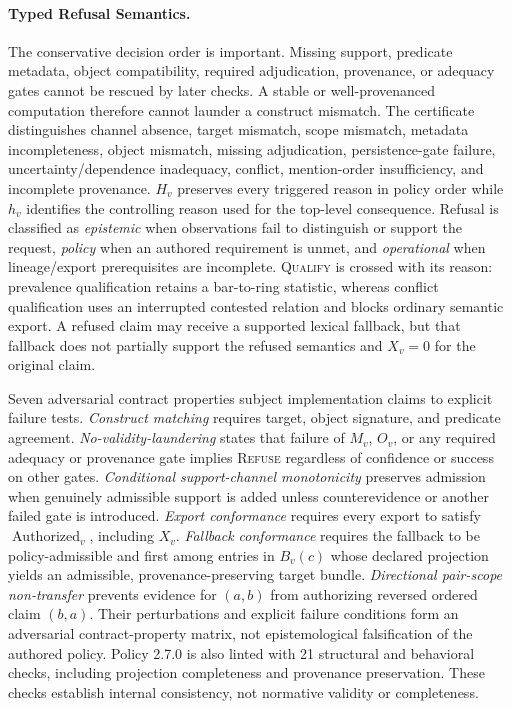 \documentclass[manuscript,screen,review,anonymous]{acmart}
\begin{document}
\paragraph{Typed Refusal Semantics.} The conservative decision order is important. Missing support, predicate metadata, object compatibility, required adjudication, provenance, or adequacy gates cannot be rescued by later checks. A stable or well-provenanced computation therefore cannot launder a construct mismatch. The certificate distinguishes channel absence, target mismatch, scope mismatch, metadata incompleteness, object mismatch, missing adjudication, persistence-gate failure, uncertainty/dependence inadequacy, conflict, mention-order insufficiency, and incomplete provenance. $H_v$ preserves every triggered reason in policy order while $h_v$ identifies the controlling reason used for the top-level consequence. Refusal is classified as \emph{epistemic} when observations fail to distinguish or support the request, \emph{policy} when an authored requirement is unmet, and \emph{operational} when lineage/export prerequisites are incomplete. \textsc{Qualify} is crossed with its reason: prevalence qualification retains a bar-to-ring statistic, whereas conflict qualification uses an interrupted contested relation and blocks ordinary semantic export. A refused claim may receive a supported lexical fallback, but that fallback does not partially support the refused semantics and $X_v=0$ for the original claim.

Seven adversarial contract properties subject implementation claims to explicit failure tests. \emph{Construct matching} requires target, object signature, and predicate agreement. \emph{No-validity-laundering} states that failure of $M_v$, $O_v$, or any required adequacy or provenance gate implies \textsc{Refuse} regardless of confidence or success on other gates. \emph{Conditional support-channel monotonicity} preserves admission when genuinely admissible support is added unless counterevidence or another failed gate is introduced. \emph{Export conformance} requires every export to satisfy $\operatorname{Authorized}_v$, including $X_v$. \emph{Fallback conformance} requires the fallback to be policy-admissible and first among entries in $B_v(c)$ whose declared projection yields an admissible, provenance-preserving target bundle. \emph{Directional pair-scope non-transfer} prevents evidence for $(a,b)$ from authorizing reversed ordered claim $(b,a)$. Their perturbations and explicit failure conditions form an adversarial contract-property matrix, not epistemological falsification of the authored policy. Policy 2.7.0 is also linted with 21 structural and behavioral checks, including projection completeness and provenance preservation. These checks establish internal consistency, not normative validity or completeness.
\end{document}
